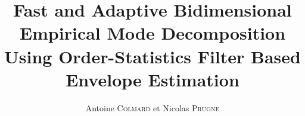 \documentclass[a4paper, 11pt]{report}
\begin{document}
\frenchspacing
{}

\title{Fast and Adaptive Bidimensional Empirical Mode Decomposition Using Order-Statistics Filter Based Envelope Estimation}
\author{Antoine \textsc{Colmard} et Nicolas \textsc{Prugne}}
\maketitle

\tableofcontents
\listoffigures






\nocite{*}


 
\end{document}
